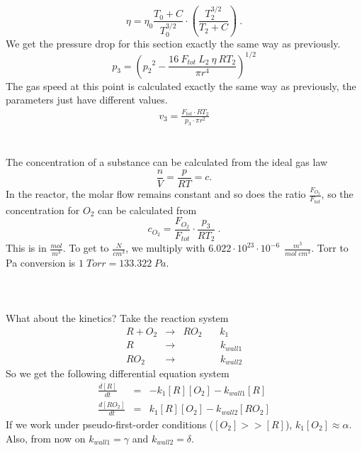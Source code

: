 \documentclass[10pt, a4paper]{article}
\begin{document}
\begin{equation*}
\eta = \eta_0 \frac{T_0 + C}{T_0^{3/2}} \cdot \left( \frac{T_{2}^{3/2}}{T_{2} + C} \right) \:.
\end{equation*}
We get the pressure drop for this section exactly the same way as previously. 
\begin{equation*}
p_3 = \left( {p_2}^2 - \frac{16\:F_{tot} \: L_2 \: \eta \: RT_2}{\pi r^4} \right)^{1/2}
\end{equation*}
The gas speed at this point is calculated exactly the same way as previously, the parameters just have different values. 
\begin{eqnarray*}
v_3 = \frac{F_{tot} \cdot RT_2}{p_3 \cdot \pi r^2}
\end{eqnarray*}
\\
\\
The concentration of a substance can be calculated from the ideal gas law 
\begin{equation*}
\frac{n}{V} = \frac{p}{RT} = c. 
\end{equation*}
In the reactor, the molar flow remains constant and so does the ratio $ \frac{F_{O_2}}{F_{tot}}$, so the concentration for $O_2$ can be calculated from 
\begin{equation*}
c_{O_2} = \frac{F_{O_2}}{F_{tot}} \cdot \frac{p_3}{RT_2} \:. 
\end{equation*}
This is in $ \frac{mol}{m^3}$. To get to $ \frac{N}{cm^3}$, we multiply with $6.022 \cdot 10^{23} \cdot 10^{-6}\:\: \frac{m^3}{mol\;cm^3} $. 
Torr to Pa conversion is $1\;Torr = 133.322\;Pa$. 
\\
\\
\\
\\
What about the kinetics? Take the reaction system 
\begin{eqnarray*}
R + O_2 &\rightarrow & RO_2 \:\:\:\:\:\:\:\: k_1 \\
R &\rightarrow&           \:\:\:\:\:\:\:\:\:\:\:\:\:\:\:\:\: k_{wall1} \\
RO_2 &\rightarrow&           \:\:\:\:\:\:\:\:\:\:\:\:\:\:\:\:\: k_{wall2}  
\end{eqnarray*}
So we get the following differential equation system 
\begin{eqnarray*}
\frac{d[R]}{dt} &=& -k_1[R][O_2] - k_{wall1}[R] \\
\frac{d[RO_2]}{dt} &=& k_1[R][O_2] - k_{wall2}[RO_2]
\end{eqnarray*}
If we work under pseudo-first-order conditions ($[O_2] >> [R]$), $k_1[O_2] \approx \alpha$. Also, from now on $k_{wall1} = \gamma$ and $k_{wall2} = \delta$. 
\end{document}
